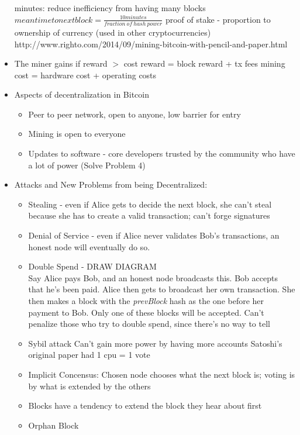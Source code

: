\documentclass{article}
\begin{document}
\begin{itemize}
     minutes: reduce inefficiency from having many blocks
    \subitem $ mean time to next block = \frac{10 minutes}{fraction\ of\ hash\ power} $
    \subitem proof of stake - proportion to ownership of currency (used in other cryptocurrencies)
    \subitem http://www.righto.com/2014/09/mining-bitcoin-with-pencil-and-paper.html
  \item The miner gains if reward $>$ cost
    \subitem reward = block reward + tx fees
    \subitem mining cost = hardware cost + operating costs
  \item Aspects of decentralization in Bitcoin
    \begin{itemize}
      \item Peer to peer network, open to anyone, low barrier for entry
      \item Mining is open to everyone
      \item Updates to software - core developers trusted by the community who have a lot of power (Solve Problem 4)
    \end{itemize}
  \item Attacks and New Problems from being Decentralized:
    \begin{itemize}
      \item Stealing - even if Alice gets to decide the next block, she can't steal because she has to create
        a valid transaction; can't forge signatures
      \item Denial of Service - even if Alice never validates Bob's transactions, an honest node will eventually do so.
      \item Double Spend - DRAW DIAGRAM\\ Say Alice pays Bob, and an honest node broadcasts this. Bob accepts that he's been paid. Alice then
        gets to broadcast her own transaction. She then makes a block with the \emph{prevBlock} hash as the one before her payment to Bob.
        Only one of these blocks will be accepted. 
        \subitem Can't penalize those who try to double spend, since there's no way to tell
      \item Sybil attack
        \subitem Can't gain more power by having more accounts
        \subitem Satoshi's original paper had 1 cpu = 1 vote
      \item Implicit Concensus:
        \subitem Chosen node chooses what the next block is; voting is by what is extended by the others
      \item Blocks have a tendency to extend the block they hear about first
      \item Orphan Block

\end{itemize}
\end{itemize}
\end{document}
